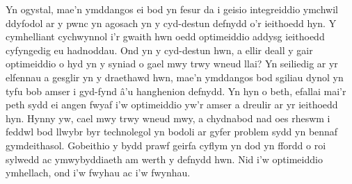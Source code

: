 Yn ogystal, mae'n ymddangos ei bod yn fesur da i geisio integreiddio ymchwil ddyfodol ar y pwnc yn agosach yn y cyd-destun defnydd o'r ieithoedd hyn. Y cymhelliant cychwynnol i'r gwaith hwn oedd optimeiddio addysg ieithoedd cyfyngedig eu hadnoddau. Ond yn y cyd-destun hwn, a ellir deall y gair optimeiddio o hyd yn y syniad o gael mwy trwy wneud llai? Yn seiliedig ar yr elfennau a gesglir yn y draethawd hwn, mae'n ymddangos bod sgiliau dynol yn tyfu bob amser i gyd-fynd â'u hanghenion defnydd. Yn hyn o beth, efallai mai'r peth sydd ei angen fwyaf i'w optimeiddio yw'r amser a dreulir ar yr ieithoedd hyn. Hynny yw, cael mwy trwy wneud mwy, a chydnabod nad oes rheswm i feddwl bod llwybr byr technolegol yn bodoli ar gyfer problem sydd yn bennaf gymdeithasol. Gobeithio y bydd prawf geirfa cyflym yn dod yn ffordd o roi sylwedd ac ymwybyddiaeth am werth y defnydd hwn. Nid i'w optimeiddio ymhellach, ond i'w fwyhau ac i'w fwynhau.
